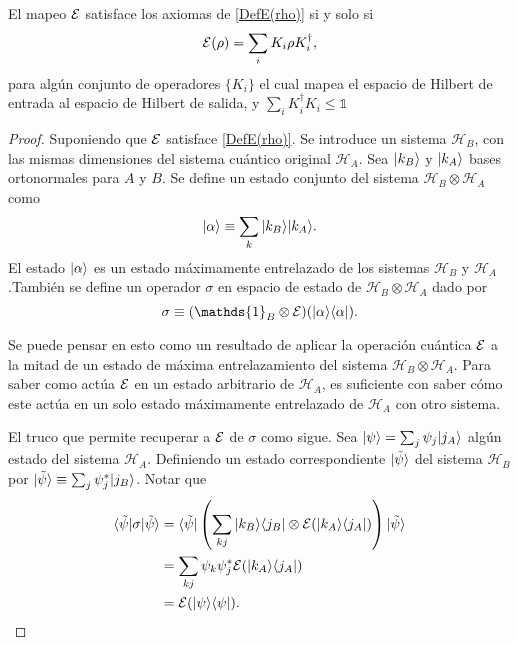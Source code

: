 \begin{theorem}
    El mapeo $\mathcal{E}$ satisface los axiomas de {\ref{DefE(rho)}} si y solo si 
    \begin{equation}
        \mathcal{E}(\rho)=\sum_i K_i \rho K_i^\dagger,
    \end{equation}
    para algún conjunto de operadores $\{K_i\}$ el cual mapea el espacio de Hilbert de entrada al espacio de Hilbert de salida, y $\sum_i K_i^\dagger K_i\le \mathds{1}$
\end{theorem}


\begin{proof}
Suponiendo que $\mathcal{E}$ satisface {\ref{DefE(rho)}}. Se introduce un sistema $\mathcal{H}_B$, con las mismas dimensiones del sistema cuántico original $\mathcal{H}_A$. Sea $|k_B\rangle$ y $|k_A\rangle$ bases ortonormales para $A$ y $B$. Se define un estado conjunto del sistema $\mathcal{H}_B\otimes \mathcal{H}_A$ como \[|\alpha\rangle \equiv \sum_k |k_B\rangle |k_A\rangle.\] El estado $|\alpha\rangle $ es un estado máximamente entrelazado de los sistemas $\mathcal{H}_B$ y $\mathcal{H}_A$.También se define un operador $\sigma$ en espacio de estado de $\mathcal{H}_B\otimes \mathcal{H}_A$ dado por 
\begin{equation}\label{sigma1}
    \sigma \equiv (\mathds{1}_B\otimes\E)(|\alpha\rala \alpha|).
\end{equation}


Se puede pensar en esto como un resultado de aplicar la operación cuántica $\mathcal{E}$ a la mitad de un estado de máxima entrelazamiento del sistema $\mathcal{H}_B\otimes \mathcal{H}_A$. Para saber como actúa $\mathcal{E}$ en un estado arbitrario de $\mathcal{H}_A$, es suficiente con saber cómo este actúa en un solo estado máximamente entrelazado de $\mathcal{H}_A$ con otro sistema.

El truco que permite recuperar a $\mathcal{E}$ de $\sigma$ como sigue. Sea $|\psi\rangle=\sum_j \psi_j |j_A\rangle$ algún estado del sistema $\mathcal{H}_A$. Definiendo un estado correspondiente $|\tilde{\psi}\rangle$ del sistema $\mathcal{H}_B$ por $|\tilde{\psi}\rangle \equiv \sum_j \psi_j^*|j_B\rangle$. Notar que
\begin{equation}
    \begin{split}
        \langle \tilde \psi |\sigma |\tilde{\psi}\rangle&= \langle \tilde \psi |\left(\sum_{kj} |k_B\rangle \langle j_B|\otimes\mathcal{E} (|k_A \rangle \langle j_A|)\right) |\tilde{\psi}\rangle\\
        &=\sum_{kj} \psi_k \psi_j^* \mathcal{E} (|k_A \rangle \langle j_A|)\\
        &=\mathcal{E}(|\psi\rangle \langle\psi|).
    \end{split}
\end{equation}



\end{proof}
